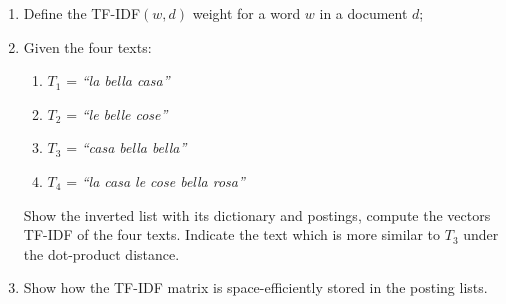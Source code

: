 \exercise

\begin{enumerate}

  \item Define the TF-IDF$(w, d)$ weight for a word $w$ in a document $d$;

  \item Given the four texts:
  \begin{enumerate}
    \item $T_1$ = \emph{``la bella casa''}
    \item $T_2$ = \emph{``le belle cose''}
    \item $T_3$ = \emph{``casa bella bella''}
    \item $T_4$ = \emph{``la casa le cose bella rosa''}
  \end{enumerate}
  Show the inverted list with its dictionary and postings, compute the vectors
  TF-IDF of the four texts. Indicate the text which is more similar to $T_3$
  under the dot-product distance.

  \item Show how the TF-IDF matrix is space-efficiently stored in the posting
  lists.

\end{enumerate}

\solution

